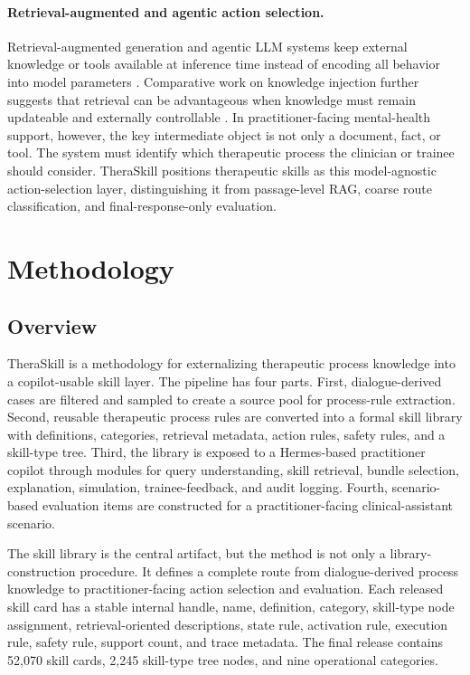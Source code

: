 \documentclass[11pt]{article}
\begin{document}
\paragraph{Retrieval-augmented and agentic action selection.}
Retrieval-augmented generation and agentic LLM systems keep external knowledge or tools available at inference time instead of encoding all behavior into model parameters \citep{lewis2020rag,yao2023react,schick2023toolformer}. Comparative work on knowledge injection further suggests that retrieval can be advantageous when knowledge must remain updateable and externally controllable \citep{ouvadia2023finetuning}. In practitioner-facing mental-health support, however, the key intermediate object is not only a document, fact, or tool. The system must identify which therapeutic process the clinician or trainee should consider. TheraSkill positions therapeutic skills as this model-agnostic action-selection layer, distinguishing it from passage-level RAG, coarse route classification, and final-response-only evaluation.

\section{Methodology}

\subsection{Overview}

TheraSkill is a methodology for externalizing therapeutic process knowledge into a copilot-usable skill layer. The pipeline has four parts. First, dialogue-derived cases are filtered and sampled to create a source pool for process-rule extraction. Second, reusable therapeutic process rules are converted into a formal skill library with definitions, categories, retrieval metadata, action rules, safety rules, and a skill-type tree. Third, the library is exposed to a Hermes-based practitioner copilot through modules for query understanding, skill retrieval, bundle selection, explanation, simulation, trainee-feedback, and audit logging. Fourth, scenario-based evaluation items are constructed for a practitioner-facing clinical-assistant scenario.

The skill library is the central artifact, but the method is not only a library-construction procedure. It defines a complete route from dialogue-derived process knowledge to practitioner-facing action selection and evaluation. Each released skill card has a stable internal handle, name, definition, category, skill-type node assignment, retrieval-oriented descriptions, state rule, activation rule, execution rule, safety rule, support count, and trace metadata. The final release contains 52,070 skill cards, 2,245 skill-type tree nodes, and nine operational categories.
\end{document}
